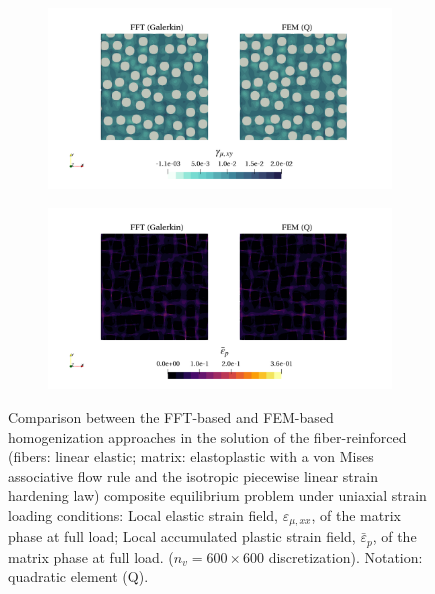 \begin{figure}[hbt]
  \centering
	\begin{subfigure}[b]{\textwidth}
    \centering
    \includegraphics[width=\textwidth]{figures/von_mises_res_mat_small_strain_2D_shear_elastic_strain_12}
    \caption{}
    \label{subfig:von_mises_res_mat_small_strain_2D_shear_elastic_strain_12}
  \end{subfigure}
  \begin{subfigure}[b]{\textwidth}
    \centering
    \includegraphics[width=\textwidth]{figures/von_mises_res_mat_small_strain_2D_shear_palstic_strain}
    \caption{}
    \label{subfig:von_mises_res_mat_small_strain_2D_shear_palstic_strain}
  \end{subfigure}
  \caption{Comparison between the FFT-based and FEM-based homogenization approaches in the
  solution of the fiber-reinforced (fibers: linear elastic; matrix: elastoplastic with a von Mises associative flow rule and the isotropic piecewise linear strain hardening law) composite equilibrium problem under uniaxial
  strain loading conditions:  Local elastic strain field, \(\varepsilon_{\mu,xx}\), of the matrix phase at full load;  Local accumulated plastic strain field, \(\bar{\varepsilon}_{p}\), of the matrix phase at full load.  (\(n_v = 600 \times 600\) discretization). Notation: quadratic element (Q).}
\label{fig:von_mises_res_mat_small_strain_2D_shear_local_fields}
\end{figure}



